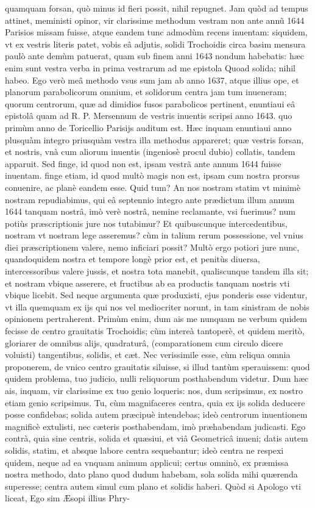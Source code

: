 \documentclass[11pt,a4paper]{article}
\begin{document}
quamquam forsan, quò minus id fieri possit, nihil repugnet. Jam quòd ad tempus attinet, meministi opinor, vir clarissime methodum vestram non ante annũ 1644 Parisios missam fuisse, atque eandem tunc admodùm recens inuentam: siquidem, vt ex vestris literis patet, vobis eâ adjutis, solidi Trochoidis circa basim mensura paulò ante demùm patuerat, quam sub finem anni 1643 nondum habebatis: hæc enim sunt vestra verba in prima vestrarum ad me epistola Quoad solida; nihil habeo. Ego verò meâ methodo vsus sum jam ab anno 1637, atque illius ope, et planorum parabolicorum omnium, et solidorum centra jam tum inueneram; quorum centrorum, quæ ad dimidios fusos parabolicos pertinent, enuntiaui eâ epistolâ quam ad R. P. Mersennum de vestris inuentis scripsi anno 1643. quo primùm anno de Toricellio Parisijs auditum est. Hæc inquam enuntiaui anno plusquàm integro priusquàm vestra illa methodus appareret; quæ vestris forsan, et nostris, vnà cum aliorum inuentis (ingeniosè procul dubio) collatis, tandem apparuit. Sed finge, id quod non est, ipsam vestrã ante annum 1644 fuisse inuentam. finge etiam, id quod multò magis non est, ipsam cum nostra prorsus conuenire, ac planè eandem esse. Quid tum? An nos nostram statim vt minimè nostram repudiabimus, qui eâ septennio integro ante prædictum illum annum 1644 tanquam nostrâ, imò verè nostrâ, nemine reclamante, vsi fuerimus? num potiùs præscriptionis jure nos tutabimur? Et quibuscunque intercedentibus, nostram vt nostram lege asseremus? cùm in talium rerum possessione, vel vnius diei præscriptionem valere, nemo inficiari possit? Multò ergo potiori jure nunc, quandoquidem nostra et tempore longè prior est, et penitùs diuersa, intercessoribus valere jussis, et nostra tota manebit, qualiscunque tandem illa sit; et nostram vbique asserere, et fructibus ab ea productis tanquam nostris vti vbique licebit. Sed neque argumenta quæ produxisti, ejus ponderis esse videntur, vt illa quemquam ex ijs qui nos vel mediocriter norunt, in tam sinistram de nobis opinionem pertraherent. Primùm enim, dum ais me nunquam ne verbum quidem fecisse de centro grauitatis Trochoidis; cùm intereà tantoperè, et quidem meritò, gloriarer de omnibus alijs, quadraturâ, (comparationem cum circulo dicere voluisti) tangentibus, solidis, et cæt. Nec verissimile esse, cùm reliqua omnia proponerem, de vnico centro grauitatis siluisse, si illud tantùm sperauissem: quod quidem problema, tuo judicio, nulli reliquorum posthabendum videtur. Dum hæc ais, inquam, vir clarissime ex tuo genio loqueris: nos, dum scripsimus, ex nostro etiam genio scripsimus. Tu, cùm magnifaceres centra, quia ex ijs solida deducere posse confidebas; solida autem præcipuè intendebas; ideò centrorum inuentionem magnificè extulisti, nec cæteris posthabendam, imò præhabendam judicasti. Ego contrà, quia sine centris, solida et quæsiui, et viâ Geometricâ inueni; datis autem solidis, statim, et absque labore centra sequebantur; ideò centra ne respexi quidem, neque ad ea vnquam animum applicui; certus omninò, ex præmissa nostra methodo, dato plano quod dudum habebam, sola solida mihi quærenda superesse; centra autem simul cum plano et solidis haberi. Quòd si Apologo vti liceat, Ego sim Æsopi illius Phry-
\end{document}
